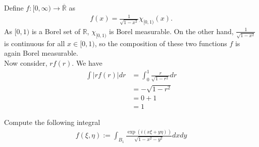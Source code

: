 \proof Define \(f: [0, \infty) \rightarrow \overline{\mathbb{R}}\) as
\begin{align}
    f(x) = \frac{1}{\sqrt{1 - x^2}} \chi_{[0, 1)}(x) \text{.}
\end{align}
As \([0, 1)\) is a Borel set of \(\mathbb{R}\), \(\chi_{[0, 1)}\) is Borel measurable. On the other hand, \(\frac{1}{\sqrt{1 - x^2}}\) is continuous for all \(x \in [0, 1)\), so the composition of these two functions \(f\) is again Borel measurable.\\
Now consider, \(r f(r)\). We have
\begin{align}
    \int |r f(r)| dr &= \int_0^1 \frac{r}{\sqrt{1 - r^2}} dr \\
    &= -\sqrt{1 - r^2} \\
    &= 0 + 1 \\
    &= 1
\end{align}
\begin{example}
    Compute the following integral
    \begin{align}
        f(\xi, \eta) := \int_{B_1} \frac{\exp(i (x\xi + y\eta))}{\sqrt{1 - x^2 -y^2}} dx dy
    \end{align}
\end{example}
